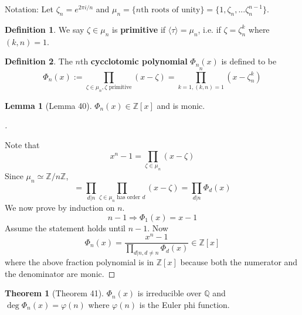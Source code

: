 \documentclass{article}
\theoremstyle{definition}
\newtheorem{thm}{Theorem}
\newtheorem{lem}{Lemma}
\newtheorem{dfn}{Definition}
\newenvironment{proofs}[1][\proofname]{%
  \begin{proof}[#1]$ $\par\nobreak\ignorespaces
}{%
  \end{proof}
}
\begin{document}
Notation: Let $\zeta_n = e^{2 \pi i/n}$ and $\mu_n = \{ n\text{th roots of unity}\} = \{1, \zeta_n, ... \zeta_n^{n - 1}\}$.

\begin{dfn}
	We say $\zeta \in \mu_n$ is \textbf{primitive} if $\langle \tau \rangle = \mu_n$, i.e. if $\zeta = \zeta_n^k$ where $(k, n) = 1$.
\end{dfn}

\begin{dfn}
	The $n$th \textbf{cycclotomic polynomial} $\Phi_n(x)$ is defined to be 
	\[
		\Phi_n(x) := \prod_{\zeta \in \mu_n, \zeta \text{ primitive}} (x - \zeta) = \prod_{k = 1, (k, n) = 1}^n (x -  \zeta_n^k)
	\]
\end{dfn}

\begin{lem}[Lemma 40]
	$\Phi_n(x) \in \mathbb{Z}[x]$ and is monic.	
\end{lem}

\begin{proofs}
	Note that 
	\[
		x^n - 1 = \prod_{\zeta \in \mu_n} (x - \zeta)
	\]
	Since $\mu_n \simeq \mathbb{Z}/n \mathbb{Z}$,  
	\[
		= \prod_{d | n} \prod_{\zeta \in \mu_n \text{ has order } d} (x - \zeta) = \prod_{d | n} \Phi_d(x)
	\]
	We now prove by induction on $n$.
	\[
		n - 1 \Rightarrow \Phi_1(x) = x- 1
	\]
	Assume the statement holds until $n - 1$.
	Now 
	\[
		\Phi_n(x) = \frac{x^n - 1}{\prod_{d|n, d \neq n} \Phi_d(x)} \in \mathbb{Z}[x]
	\]
	where the above fraction polynomial is in $\mathbb{Z}[x]$ because both the numerator and the denominator are monic.
\end{proofs}

\begin{thm}[Theorem 41]
	$\Phi_n(x)$ is irreducible over $\mathbb{Q}$ and $\deg \Phi_n(x) = \varphi(n)$ where $\varphi(n)$ is the Euler phi function.
\end{thm}
\end{document}
